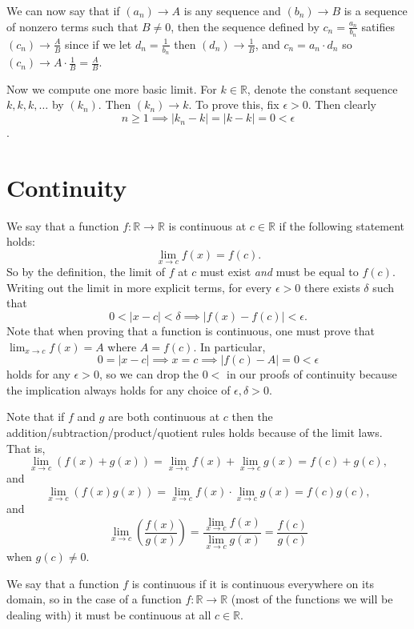 \documentclass{article}[11pt]
\newcommand{\R}{\mathbb{R}}
\newcommand{\eps}{\epsilon}
\begin{document}
    We can now say that if $(a_n) \to A$ is any sequence and $(b_n) \to B$ is a sequence of nonzero terms such that $B \neq 0$, then the sequence defined by $c_n = \frac{a_n}{b_n}$ satifies $(c_n) \to \frac{A}{B}$ since if we let $d_n = \frac{1}{b_n}$ then $(d_n) \to \frac{1}{B}$, and $c_n = a_n \cdot d_n$ so $(c_n) \to A \cdot \frac{1}{B} = \frac{A}{B}$.


    Now we compute one more basic limit. For $k \in \R$, denote the constant sequence $k, k, k, \dots$ by $(k_n)$. Then $(k_n) \to k$. To prove this, fix $\eps > 0$. Then clearly
    $$ n \geq 1 \implies |k_n - k| = |k - k| = 0 < \eps $$.

    \section{Continuity}
    We say that a function $f: \R \to \R$ is continuous at $c \in \R$ if the following statement holds: 
    $$ \lim_{x \to c} f(x) = f(c) .$$
    So by the definition, the limit of $f$ at $c$ must exist \emph{and} must be equal to $f(c)$. Writing out the limit in more explicit terms, for every $\eps > 0$ there exists $\delta$ such that
   $$ 0 < |x - c| < \delta \implies |f(x) - f(c)| < \eps .$$
   Note that when proving that a function is continuous, one must prove that $\lim_{x \to c} f(x) = A$ where $A = f(c)$. In particular,
   $$ 0 = |x - c| \implies x = c \implies |f(c) - A| = 0 < \eps $$
   holds for any $\eps > 0$, so we can drop the $0 <$ in our proofs of continuity because the implication always holds for any choice of $\eps, \delta > 0$.

   Note that if $f$ and $g$ are both continuous at $c$ then the addition/subtraction/product/quotient rules holds because of the limit laws. That is,
   $$ \lim_{x \to c} (f(x) + g(x)) = \lim_{x \to c} f(x) + \lim_{x \to c} g(x) = f(c) + g(c) ,$$
   and
   $$ \lim_{x \to c} \left(f(x) g(x)\right) = \lim_{x \to c} f(x) \cdot \lim_{x \to c} g(x) = f(c)g(c) ,$$
   and
   $$ \lim_{x \to c} \left(\frac{f(x)}{g(x)}\right) = \frac{\lim_{x \to c} f(x)}{\lim_{x \to c} g(x)} = \frac{f(c)}{g(c)} $$
   when $g(c) \neq 0$.

   We say that a function $f$ is continuous if it is continuous everywhere on its domain, so in the case of a function $f: \R \to \R$ (most of the functions we will be dealing with) it must be continuous at all $c \in \R$.
\end{document}
